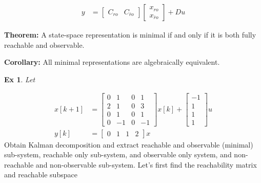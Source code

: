 \documentclass[twoside]{article}
\newtheorem{exmp}[theorem]{Ex}
\begin{document}
\begin{itemize}
\begin{align*}
        \\
        y &= \left[ \begin{array}{c|c} C_{ro} & C_{\bar{r}o} \end{array} \right] \begin{bmatrix} x_{ro} \\ x_{\bar{r}o}\end{bmatrix} + D u
    \end{align*}
\end{itemize}

\textbf{Theorem:} A state-space representation is minimal if and only if it is both fully reachable and observable. 

\textbf{Corollary:} All minimal representations are algebraically equivalent. 

\begin{exmp}
Let
\end{exmp}
\begin{align*}
    x[k+1] &= \left[ \begin{array}{cccc} 0 & 1 & 0 & 1 \\ 
    2 & 1 & 0 & 3 \\ 
    0 & 1 & 0 & 1 \\ 
    0 & -1 & 0 & -1 
    \end{array} \right] x[k] + 
    \left[ \begin{array}{c} -1 \\ 
    1 \\ 
    1 \\ 
    1
    \end{array} \right] u
    \\
    y[k] &= \left[ \begin{array}{cccc} 0 & 1 & 1 & 2 \end{array} \right] x
\end{align*}
%
Obtain Kalman decomposition and extract  reachable and observable (minimal) sub-system, reachable only sub-system, and observable only system,
and non-reachable and non-observable sub-system.
%
Let's first find the reachability matrix and reachable subspace 
%
\end{document}
